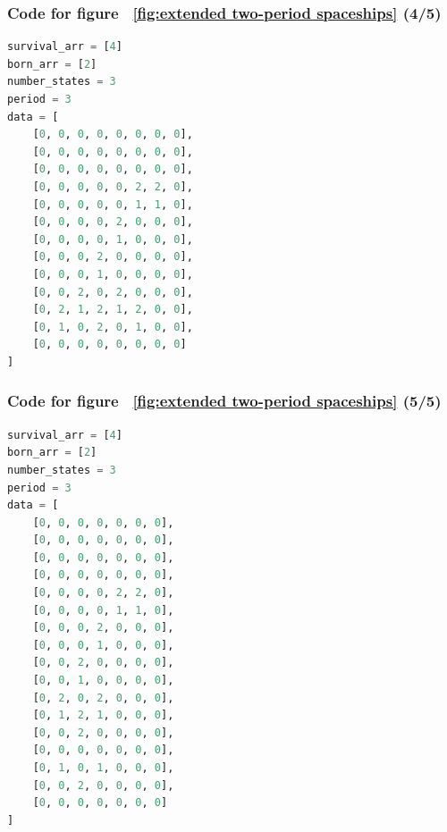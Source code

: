 \documentclass[12pt]{article}
\numberwithin{figure}{section} %
\begin{document}
\noindent\begin{minipage}{.5\textwidth}
\subsubsection{Code for figure ~\ref{fig:extended two-period spaceships} (4/5)}
\label{subsubsection:extended two-period spaceships(4/5)}
\begin{lstlisting}[language = Python]
survival_arr = [4]
born_arr = [2]
number_states = 3
period = 3 
data = [
    [0, 0, 0, 0, 0, 0, 0, 0],
    [0, 0, 0, 0, 0, 0, 0, 0],
    [0, 0, 0, 0, 0, 0, 0, 0],
    [0, 0, 0, 0, 0, 2, 2, 0],
    [0, 0, 0, 0, 0, 1, 1, 0],
    [0, 0, 0, 0, 2, 0, 0, 0],
    [0, 0, 0, 0, 1, 0, 0, 0],
    [0, 0, 0, 2, 0, 0, 0, 0],
    [0, 0, 0, 1, 0, 0, 0, 0],
    [0, 0, 2, 0, 2, 0, 0, 0],
    [0, 2, 1, 2, 1, 2, 0, 0],
    [0, 1, 0, 2, 0, 1, 0, 0],
    [0, 0, 0, 0, 0, 0, 0, 0]
]

\end{lstlisting}
\end{minipage}\hfill
\begin{minipage}{.45\textwidth}
\subsubsection{Code for figure ~\ref{fig:extended two-period spaceships} (5/5)}
\label{subsubsection:extended two-period spaceships(5/5)}
\begin{lstlisting}[language = Python]
survival_arr = [4]
born_arr = [2]
number_states = 3
period = 3
data = [
    [0, 0, 0, 0, 0, 0, 0],
    [0, 0, 0, 0, 0, 0, 0],
    [0, 0, 0, 0, 0, 0, 0],
    [0, 0, 0, 0, 0, 0, 0],
    [0, 0, 0, 0, 2, 2, 0],
    [0, 0, 0, 0, 1, 1, 0],
    [0, 0, 0, 2, 0, 0, 0],
    [0, 0, 0, 1, 0, 0, 0],
    [0, 0, 2, 0, 0, 0, 0],
    [0, 0, 1, 0, 0, 0, 0],
    [0, 2, 0, 2, 0, 0, 0],
    [0, 1, 2, 1, 0, 0, 0],
    [0, 0, 2, 0, 0, 0, 0],
    [0, 0, 0, 0, 0, 0, 0],
    [0, 1, 0, 1, 0, 0, 0],
    [0, 0, 2, 0, 0, 0, 0],
    [0, 0, 0, 0, 0, 0, 0]
]
\end{lstlisting}
\end{minipage}
\end{document}
